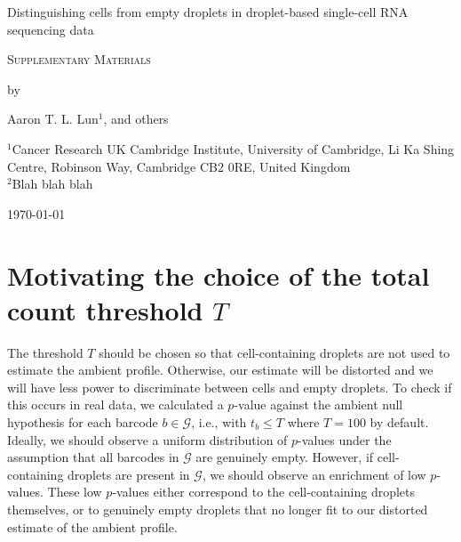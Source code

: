 \documentclass{article}
\begin{document}
\begin{titlepage}
\vspace*{3cm}
\begin{center}


{\LARGE
Distinguishing cells from empty droplets in droplet-based single-cell RNA sequencing data
\par}

\vspace{0.75cm}

{\Large
    \textsc{Supplementary Materials}
\par
}
\vspace{0.75cm}

\large
by


\vspace{0.75cm}
Aaron T. L. Lun$^1$,
and others

\vspace{1cm}
\begin{minipage}{0.9\textwidth}
\begin{flushleft}
$^1$Cancer Research UK Cambridge Institute, University of Cambridge, Li Ka Shing Centre, Robinson Way, Cambridge CB2 0RE, United Kingdom \\[6pt]
$^2$Blah blah blah \\[6pt]
\end{flushleft}
\end{minipage}

\vspace{1.5cm}
{\large \today{}}

\vspace*{\fill}
\end{center}
\end{titlepage}

\section*{Motivating the choice of the total count threshold $T$}
The threshold $T$ should be chosen so that cell-containing droplets are not used to estimate the ambient profile.
Otherwise, our estimate will be distorted and we will have less power to discriminate between cells and empty droplets.
To check if this occurs in real data, we calculated a $p$-value against the ambient null hypothesis for each barcode $b \in \mathcal{G}$, 
i.e., with $t_b \le T$ where $T = 100$ by default.
Ideally, we should observe a uniform distribution of $p$-values under the assumption that all barcodes in $\mathcal{G}$ are genuinely empty.
However, if cell-containing droplets are present in $\mathcal{G}$, we should observe an enrichment of low $p$-values.
These low $p$-values either correspond to the cell-containing droplets themselves,
or to genuinely empty droplets that no longer fit to our distorted estimate of the ambient profile.
\end{document}
